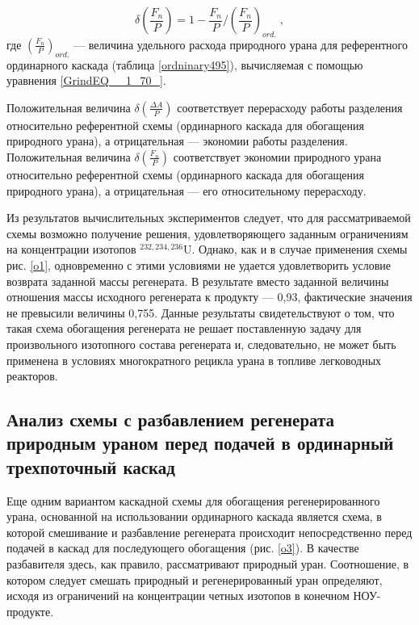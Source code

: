 \begin{equation} \label{DeltaFnu} 
  \delta(\frac{F_n}{P})=1-\frac{F_n}{P}/(\frac{F_n}{P})_{ord.} \; ,
\end{equation} 
где $(\frac{F_n}{P})_{ord.}$ --- величина удельного расхода природного урана для референтного ординарного каскада (таблица \ref{ordninary495}), вычисляемая с помощью уравнения \ref{GrindEQ__1_70_}.

Положительная величина $\delta(\frac{\Delta A}{P})$ соответствует перерасходу работы разделения относительно референтной схемы (ординарного каскада для обогащения природного урана), а отрицательная --- экономии работы разделения. Положительная величина $\delta(\frac{F_n}{P})$ соответствует экономии природного урана относительно референтной схемы (ординарного каскада для обогащения природного урана), а отрицательная --- его относительному перерасходу.


Из результатов вычислительных экспериментов следует, что для рассматриваемой схемы возможно получение решения, удовлетворяющего заданным ограничениям на концентрации изотопов $^{232,234,236}$U. Однако, как и в случае применения схемы рис. \ref{o1}, одновременно с этими условиями не удается удовлетворить условие возврата заданной массы регенерата. В результате вместо заданной величины отношения массы исходного регенерата к продукту --- 0,93, фактические значения не превысили величины 0,755. Данные результаты свидетельствуют о том, что такая схема обогащения регенерата не решает поставленную задачу для произвольного изотопного состава регенерата и, следовательно, не может быть применена в условиях многократного рецикла урана в топливе легководных реакторов.


\subsection{Анализ схемы с разбавлением регенерата природным ураном перед подачей в ординарный трехпоточный каскад}

Еще одним вариантом каскадной схемы для обогащения регенерированного урана, основанной на использовании ординарного каскада является схема, в которой смешивание и разбавление регенерата происходит непосредственно перед подачей в каскад для последующего обогащения (рис. \ref{o3}). В качестве разбавителя здесь, как правило, рассматривают природный уран. Соотношение, в котором следует смешать природный и регенерированный уран определяют, исходя из ограничений на концентрации четных изотопов в конечном НОУ-продукте.

